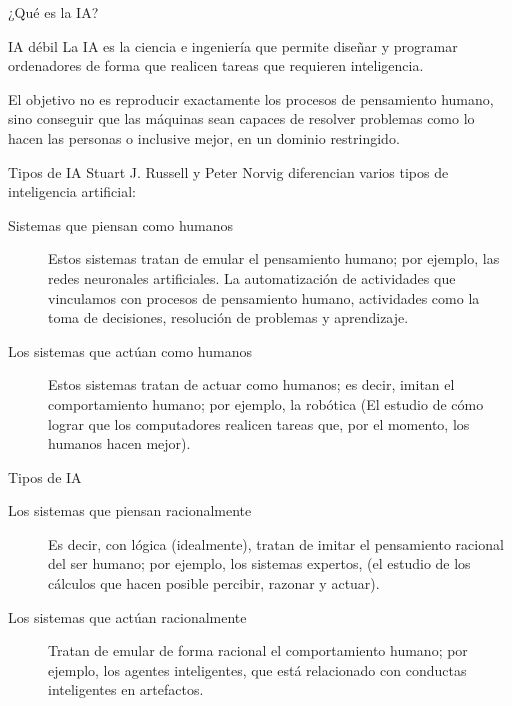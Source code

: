 \documentclass[11pt,aspectratio=169]{beamer}
\begin{document}
\begin{frame}{¿Qué es la IA?}
    \begin{block}{IA débil}\pause
        La IA es la ciencia e ingeniería que permite diseñar y programar
        ordenadores de forma que realicen tareas que requieren inteligencia.
    \end{block}\pause
    El objetivo no es reproducir exactamente los procesos de pensamiento humano,
    sino conseguir que las máquinas sean capaces de resolver problemas como lo 
    hacen las personas o inclusive mejor, en un dominio restringido.
\end{frame}

\begin{frame}{Tipos de IA}
    Stuart J. Russell y Peter Norvig diferencian varios tipos de inteligencia artificial:
    \begin{description}
        \item[Sistemas que piensan como humanos] Estos sistemas tratan de emular el pensamiento humano; por ejemplo, las redes neuronales artificiales. La automatización de actividades que vinculamos con procesos de pensamiento humano, actividades como la toma de decisiones, resolución de problemas y aprendizaje.       
        \item[Los sistemas que actúan como humanos] Estos sistemas tratan de actuar como humanos; es decir, imitan el comportamiento humano; por ejemplo, la robótica (El estudio de cómo lograr que los computadores realicen tareas que, por el momento, los humanos hacen mejor).
    \end{description}
\end{frame}

\begin{frame}{Tipos de IA}
    \begin{description}
        \item[Los sistemas que piensan racionalmente] Es decir, con lógica (idealmente), tratan de imitar el pensamiento racional del ser humano; por ejemplo, los sistemas expertos, (el estudio de los cálculos que hacen posible percibir, razonar y actuar).
        \item[Los sistemas que actúan racionalmente] Tratan de emular de forma racional el comportamiento humano; por ejemplo, los agentes inteligentes, que está relacionado con conductas inteligentes en artefactos.
    \end{description}
\end{frame}

\end{document}
